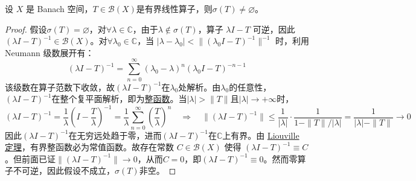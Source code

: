 \begin{theorem}
设 $X$ 是 Banach 空间，$T\in\mathscr{B}(X)$是有界线性算子，则$\sigma(T) \neq \varnothing$。
\end{theorem}
\begin{proof}
假设$\sigma(T) = \varnothing$，对$\forall \lambda \in \mathbb{C}$，由于$\lambda \notin \sigma(T)$，算子 $\lambda I - T$ 可逆，因此$(\lambda I - T)^{-1} \in \mathscr{B}(X)$。对$\forall \lambda_0 \in \mathbb{C}$，当 $|\lambda - \lambda_0| < \|(\lambda_0 I - T)^{-1}\|^{-1}$ 时，利用 Neumann 级数展开有：
\[(\lambda I - T)^{-1}=\sum_{n=0}^{\infty} (\lambda_0 - \lambda)^n (\lambda_0 I - T)^{-n-1}\]
该级数在算子范数下收敛，故$(\lambda I - T)^{-1}$在$\lambda_0$处解析。由$\lambda_0$的任意性，$(\lambda I - T)^{-1}$在整个复平面解析，即为\href{https://math.fandom.com/zh/wiki/%E6%95%B4%E5%87%BD%E6%95%B0}{整函数}。当$|\lambda| > \|T\|$且$|\lambda| \to +\infty$时，
\[(\lambda I - T)^{-1} = \frac{1}{\lambda}\left(I - \frac{T}{\lambda}\right)^{-1}= \frac{1}{\lambda}\sum_{n=0}^{\infty}\left(\frac{T}{\lambda}\right)^n \quad \Rightarrow \quad \|(\lambda I - T)^{-1}\| \le \frac{1}{|\lambda|} \cdot \frac{1}{1 - \|T\|/|\lambda|}= \frac{1}{|\lambda| - \|T\|}\to0\]
因此$(\lambda I - T)^{-1}$在无穷远处趋于零，进而$(\lambda I - T)^{-1}$在$\mathbb{C}$上有界。由 \href{https://math.fandom.com/zh/wiki/Liouville_%E5%AE%9A%E7%90%86}{Liouville 定理}，有界整函数必为常值函数。故存在常数 $C \in \mathscr{B}(X)$ 使得 $(\lambda I - T)^{-1} \equiv C$。但前面已证$\|(\lambda I - T)^{-1}\|\to0$，从而$C=0$，即$(\lambda I - T)^{-1}\equiv 0$。然而零算子不可逆，因此假设不成立，$\sigma(T)$非空。
\end{proof}

